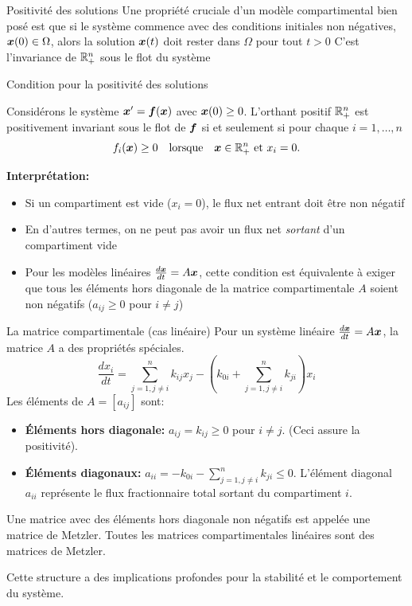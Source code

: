 \documentclass[aspectratio=169]{beamer}\usepackage[]{graphicx}\usepackage[]{xcolor}
\begin{document}
\begin{frame}{Positivité des solutions}
  Une propriété cruciale d'un modèle compartimental bien posé est que si le système commence avec des conditions initiales non négatives, $\vect{x}(0) \in \Omega$, alors la solution $\vect{x}(t)$ doit rester dans $\Omega$ pour tout $t > 0$
  \vfill
  C'est l'invariance de $\IR_+^n$ sous le flot du système
\end{frame}

\begin{frame}{Condition pour la positivité des solutions}
    \begin{theorem}
        Considérons le système $\bx' = \vect{f}(\vect{x})$ avec $\vect{x}(0) \ge 0$. L'orthant positif $\IR_+^n$ est positivement invariant sous le flot de $\bf$ si et seulement si pour chaque $i=1, \dots, n$
        $$ f_i(\vect{x}) \ge 0 \quad \text{lorsque} \quad \vect{x} \in \IR_+^n \text{ et } x_i=0. $$
    \end{theorem}
    \vfill
    \textbf{Interprétation:}
    \begin{itemize}
        \item Si un compartiment est vide ($x_i=0$), le flux net entrant doit être non négatif
        \item En d'autres termes, on ne peut pas avoir un flux net \textit{sortant} d'un compartiment vide
        \item Pour les modèles linéaires $\frac{d\vect{x}}{dt} = A\vect{x}$, cette condition est équivalente à exiger que tous les éléments hors diagonale de la matrice compartimentale $A$ soient non négatifs ($a_{ij} \ge 0$ pour $i \neq j$)
    \end{itemize}
\end{frame}

\begin{frame}{La matrice compartimentale (cas linéaire)}
    Pour un système linéaire $\frac{d\vect{x}}{dt} = A\vect{x}$, la matrice $A$ a des propriétés spéciales.
    $$ \frac{dx_i}{dt} = \sum_{j=1, j \neq i}^{n} k_{ij}x_j - \left(k_{0i} + \sum_{j=1, j \neq i}^{n} k_{ji}\right)x_i $$
    Les éléments de $A = [a_{ij}]$ sont:
    \begin{itemize}
        \item \textbf{Éléments hors diagonale:} $a_{ij} = k_{ij} \ge 0$ pour $i \neq j$. (Ceci assure la positivité).
        \item \textbf{Éléments diagonaux:} $a_{ii} = -k_{0i} - \sum_{j=1, j \neq i}^{n} k_{ji} \le 0$. L'élément diagonal $a_{ii}$ représente le flux fractionnaire total sortant du compartiment $i$.
    \end{itemize}
    \vfill
    \begin{definition}
        Une matrice avec des éléments hors diagonale non négatifs est appelée une matrice de Metzler. Toutes les matrices compartimentales linéaires sont des matrices de Metzler.
    \end{definition}
    Cette structure a des implications profondes pour la stabilité et le comportement du système.
\end{frame}
\end{document}
